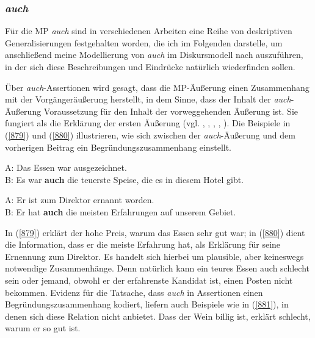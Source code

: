{\subsubsection{\textit{auch}}
\label{sec:auch}
Für die MP \textit{auch} sind in verschiedenen Arbeiten eine Reihe von deskriptiven Generalisierungen festgehalten worden, die ich im Folgenden darstelle, um anschließend meine Modellierung von \textit{auch} im Diskursmodell nach \citet{Farkas2010} auszuführen, in der sich diese Beschreibungen und Eindrücke natürlich wiederfinden sollen.

Über \textit{auch}-Assertionen wird gesagt, dass die MP-Äußerung einen Zusammenhang mit der Vorgängeräußerung herstellt, in dem Sinne, dass der Inhalt der \textit{auch}-Äußerung Voraussetzung für den Inhalt der vorweggehenden Äußerung ist. Sie fungiert als die Erklärung der ersten Äußerung (vgl. \citealt[47]{Dahl1988}, \citealt[160]{Thurmair1989}, \citealt[1226]{Zifonun1997}, \citealt[343]{Karagjosova2004}, \citealt[222]{Moellering2004}). Die Beispiele in (\ref{879}) und (\ref{880}) illustrieren, wie sich zwi\-schen der \textit{auch}-Äußerung und dem vorherigen Beitrag ein Begründungszusammenhang einstellt.

\begin{exe}
	\ex\label{879}
	A: Das Essen war ausgezeichnet.\\
	B: Es war \textbf{auch} die teuerste Speise, die es in diesem Hotel gibt.	
\end{exe}

\begin{exe}
	\ex\label{880}
	A: Er ist zum Direktor ernannt worden.\\
	B: Er hat \textbf{auch} die meisten Erfahrungen auf unserem Gebiet.	 
	\newline
	\hbox{}\hfill\hbox {\citet[88]{Helbig1990}}
\end{exe}
In (\ref{879}) erklärt der hohe Preis, warum das Essen sehr gut war; in (\ref{880}) dient die Information, dass er die meiste Erfahrung hat, als Erklärung für seine Ernennung zum Direktor. Es handelt sich hierbei um plausible, aber keineswegs notwendige Zusammenhänge. Denn natürlich kann ein teures Essen auch schlecht sein oder jemand, obwohl er der erfahrenste Kandidat ist, einen Posten nicht bekommen. Evidenz für die Tatsache, dass \textit{auch} in Assertionen einen Begründungszusammenhang kodiert, liefern auch Beispiele wie in (\ref{881}), in denen sich diese Relation nicht anbietet. Dass der Wein billig ist, erklärt schlecht, warum er so gut ist.

}
